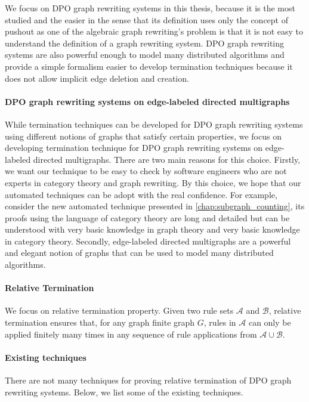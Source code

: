    We focus on DPO graph rewriting systems in this thesis, because it is the most studied and the easier in the sense that its definition uses only the concept of pushout as one of the algebraic graph rewriting's problem is that it is not easy to understand the definition of a graph rewriting system. DPO graph rewriting systems are also powerful enough to model many distributed algorithms and provide a simple formalism easier to develop termination techniques because it does not allow implicit edge deletion and creation.



\paragraph{DPO graph rewriting systems on edge-labeled directed multigraphs}
 While termination techniques can be developed for DPO graph rewriting systems using different notions of graphs that satisfy certain properties, we focus on developing termination technique for DPO graph rewriting systems on edge-labeled directed multigraphs.
 There are two main reasons for this choice.
 Firstly, we want our technique to be easy to check by software engineers who are not experts in category theory and graph rewriting.  
 By this choice, we hope that our automated techniques can be adopt with the real confidence.
 For example, consider the new automated technique presented in \autoref{chap:subgraph_counting}, its proofs using the language of category theory are long and detailed but can be understood with very basic knowledge in graph theory and very basic knowledge in category theory.
Secondly, edge-labeled directed multigraphs are a powerful and elegant notion of graphs that can be used to model many distributed algorithms.


\paragraph{Relative Termination}
We focus on relative termination property. Given two rule sets \( \mathcal{A} \) and \( \mathcal{B} \), relative termination ensures that, for any graph finite graph $G$,
rules in $\mathcal{A}$ can only be applied finitely many times in any sequence of rule applications from $\mathcal{A} \cup \mathcal{B}$. 


\paragraph{Existing techniques}
There are not many techniques for proving relative termination of DPO graph rewriting systems. Below, we list some of the existing techniques.
 

